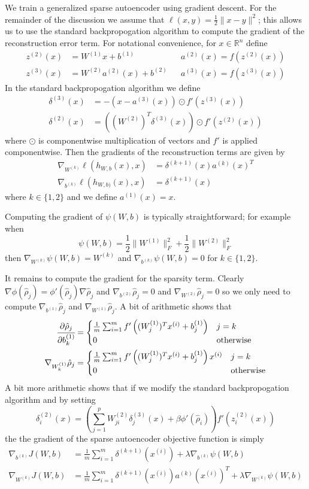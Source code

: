 \documentclass[twocolumn]{article}
\newcommand{\RR}{\mathbb{R}}
\newcommand{\Wo}{W^{(1)}}
\newcommand{\Wt}{W^{(2)}}
\newcommand{\bo}{b^{(1)}}
\newcommand{\bt}{b^{(2)}}
\newcommand{\zr}{z^{(3)}}
\newcommand{\zt}{z^{(2)}}
\newcommand{\ar}{a^{(3)}}
\newcommand{\at}{a^{(2)}}
\newcommand{\ao}{a^{(1)}}
\newcommand{\dr}{\delta^{(3)}}
\newcommand{\dt}{\delta^{(2)}}
\newcommand{\xii}{x^{(i)}}
\newcommand{\pd}[2]{\ensuremath{\cfrac{\partial #1}{\partial #2}}}
\begin{document}
We train a generalized sparse autoencoder using gradient descent.
For the remainder of the discussion we assume that $\ell(x,y)=\frac12\|x-y\|^2$;
this allows us to use the standard backpropogation algorithm to compute
the gradient of the reconstruction error term. For notational convenience, for $x\in\RR^n$ define
\begin{align*}
  \zt(x) &=\Wo x+\bo && \at(x) = f(\zt(x)) \\
  \zr(x) &=\Wt\at(x)+\bt && \ar(x) = f(\zr(x))
\end{align*}
In the standard backpropogation algorithm we define
\begin{align*}
  \dr(x) &= -(x-\ar(x))\odot f'(\zr(x)) \\
  \dt(x) &= \left((\Wt)^T\dr(x)\right)\odot f'(\zt(x))
\end{align*}
where $\odot$ is componentwise multiplication of vectors and $f'$ is applied componentwise.
Then the gradients of the reconstruction terms are given by
\begin{align*}
  \nabla_{W^{(k)}}\ell(h_{W,b}(x),x) &= \delta^{(k+1)}(x)a^{(k)}(x)^T \\
  \nabla_{b^{(k)}}\ell(h_{W,b)}(x),x) &= \delta^{(k+1)}(x)
\end{align*}
where $k\in\{1,2\}$ and we define $\ao(x)=x$.

Computing the gradient of $\psi(W,b)$ is typically straightforward; for example when
\[\psi(W,b)=\frac12\|\Wo\|_F^2+\frac12\|\Wt\|_F^2\] then $\nabla_{W^{(k)}}\psi(W,b)=W^{(k)}$ and
$\nabla_{b^{(k)}}\psi(W,b)=0$ for $k\in\{1,2\}$.

It remains to compute the gradient for the sparsity term.
Clearly $\nabla\phi(\hat\rho_j)=\phi'(\hat\rho_j)\nabla\hat\rho_j$ and $\nabla_{\bt}\hat\rho_j=0$ and
$\nabla_{\Wt}\hat\rho_j=0$ so we only need to compute $\nabla_{\bo}\hat\rho_j$ and $\nabla_{\Wo}\hat\rho_j$.
A bit of arithmetic shows that
\begin{align*}
  \pd{\hat\rho_j}{\bo_k} &= \begin{cases} 
      \frac1m\sum_{i=1}^mf'\left((\Wo_j)^T\xii+\bo_j\right) & j=k \\
      0 & \textrm{otherwise}
  \end{cases} \\
    \nabla_{\Wo_k}\hat\rho_j &= \begin{cases}
      \frac1m\sum_{i=1}^mf'\left((\Wo_j)^T\xii+\bo_j\right)\xii & j=k \\
      0 & \textrm{otherwise}
    \end{cases}
\end{align*}
A bit more arithmetic shows that if we modify the standard backpropogation algorithm and by setting
\[\dt_i(x) = \left(\sum_{j=1}^p\Wt_{ji}\dr_j(x)+\beta\phi'(\hat\rho_i)\right)f'\left(\zt_i(x)\right)\]
the the gradient of the sparse autoencoder objective function is simply
\begin{align*}
  \nabla_{b^{(k)}}J(W,b) &= \frac1m\sum_{i=1}^m\delta^{(k+1)}(\xii) + \lambda\nabla_{b^{(k)}}\psi(W,b) \\
  \nabla_{W^{(k)}}J(W,b) &= \frac1m\sum_{i=1}^m\delta^{(k+1)}(\xii)a^{(k)}(\xii)^T
    + \lambda\nabla_{W^{(k)}}\psi(W,b)
\end{align*}



\end{document}
